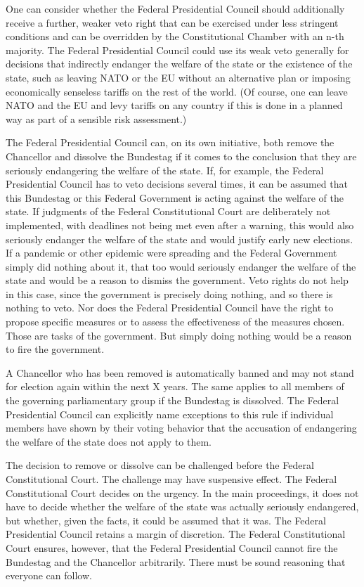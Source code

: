 One can consider whether the Federal Presidential Council should additionally receive a further, weaker veto right that can be exercised under less stringent conditions and can be overridden by the Constitutional Chamber with an n-th majority.
The Federal Presidential Council could use its weak veto generally for decisions that indirectly endanger the welfare of the state or the existence of the state, such as leaving NATO or the EU without an alternative plan or imposing economically senseless tariffs on the rest of the world.
(Of course, one can leave NATO and the EU and levy tariffs on any country if this is done in a planned way as part of a sensible risk assessment.)

\label{subsubsubsec:removal_by_council}

The Federal Presidential Council can, on its own initiative, both remove the Chancellor and dissolve the Bundestag if it comes to the conclusion that they are seriously endangering the welfare of the state.
If, for example, the Federal Presidential Council has to veto decisions several times, it can be assumed that this Bundestag or this Federal Government is acting against the welfare of the state.
If judgments of the Federal Constitutional Court are deliberately not implemented, with deadlines not being met even after a warning, this would also seriously endanger the welfare of the state and would justify early new elections.
If a pandemic or other epidemic were spreading and the Federal Government simply did nothing about it, that too would seriously endanger the welfare of the state and would be a reason to dismiss the government.
Veto rights do not help in this case, since the government is precisely doing nothing, and so there is nothing to veto.
Nor does the Federal Presidential Council have the right to propose specific measures or to assess the effectiveness of the measures chosen.
Those are tasks of the government.
But simply doing nothing would be a reason to fire the government.

A Chancellor who has been removed is automatically banned and may not stand for election again within the next X years.
The same applies to all members of the governing parliamentary group if the Bundestag is dissolved.
The Federal Presidential Council can explicitly name exceptions to this rule if individual members have shown by their voting behavior that the accusation of endangering the welfare of the state does not apply to them.

The decision to remove or dissolve can be challenged before the Federal Constitutional Court.
The challenge may have suspensive effect.
The Federal Constitutional Court decides on the urgency.
In the main proceedings, it does not have to decide whether the welfare of the state was actually seriously endangered, but whether, given the facts, it could be assumed that it was.
The Federal Presidential Council retains a margin of discretion.
The Federal Constitutional Court ensures, however, that the Federal Presidential Council cannot fire the Bundestag and the Chancellor arbitrarily.
There must be sound reasoning that everyone can follow.
